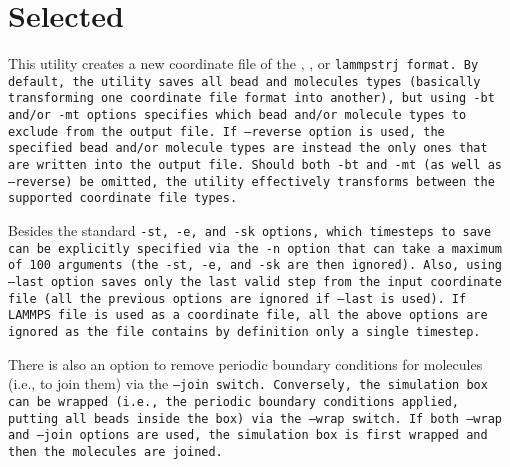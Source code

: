 \section{Selected} \label{sec:Selected}

This utility creates a new coordinate file of the \xyz, \vtcf, or \tt{lammpstrj}
format. By default, the utility saves all bead and molecules types (basically
transforming one coordinate file format into another), but using \tt{-bt} and/or
\tt{-mt} options specifies which bead and/or molecule types to exclude from the
output file. If \tt{--reverse} option is used, the specified bead and/or
molecule types are instead the only ones that are written into the output file.
Should both \tt{-bt} and \tt{-mt} (as well as \tt{--reverse}) be omitted, the
utility effectively transforms between the supported coordinate file types.

Besides the standard \tt{-st}, \tt{-e}, and \tt{-sk} options, which timesteps to
save can be explicitly specified via the \tt{-n} option that can take a maximum
of 100 arguments (the \tt{-st}, \tt{-e}, and \tt{-sk} are then ignored). Also,
using \tt{--last} option saves only the last valid step from the input
coordinate file (all the previous options are ignored if \tt{--last} is used).
If LAMMPS \data file is used as a coordinate file, all the above options are
ignored as the \data file contains by definition only a single timestep.

There is also an option to remove periodic boundary conditions for molecules
(i.e., to join them) via the \tt{--join} switch. Conversely, the simulation box
can be wrapped (i.e., the periodic boundary conditions applied, putting all
beads inside the box) via the \tt{--wrap} switch. If both \tt{--wrap} and
\tt{--join} options are used, the simulation box is first wrapped and then the
molecules are joined.

